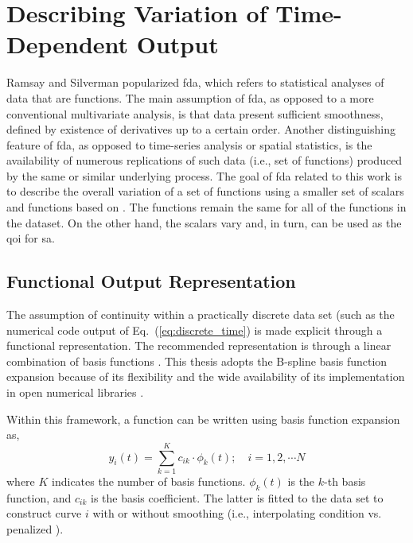 \section{Describing Variation of Time-Dependent Output}\label{sec:sa_time_dependent_variation}

Ramsay and Silverman \cite{Ramsay2005} popularized \gls{fda}, which refers to statistical analyses of data that are functions.
The main assumption of \gls{fda}, as opposed to a more conventional multivariate analysis, is that data present sufficient smoothness, defined by existence of derivatives up to a certain order.
Another distinguishing feature of \gls{fda}, as opposed to time-series analysis or spatial statistics, is the availability of numerous replications of such data (i.e., set of functions) produced by the same or similar underlying process. 
The goal of \gls{fda} related to this work is to describe the overall variation of a set of functions using a smaller set of scalars and functions based on .
The functions remain the same for all of the functions in the dataset. 
On the other hand, the scalars vary and, in turn, can be used as the \gls{qoi} for \gls{sa}.

\subsection{Functional Output Representation}\label{sub:sa_spline}

The assumption of continuity within a practically discrete data set (such as the numerical code output of Eq.~(\ref{eq:discrete_time}) is made explicit through a functional representation.
The recommended representation is through a linear combination of basis functions \cite{Ramsay2005}.
This thesis adopts the B-spline basis function \cite{Gillies2010} expansion because of its flexibility \cite{Eilers1996,Eilers2010} 
and the wide availability of its implementation in open numerical libraries \cite{RCT2017}.

Within this framework, a function can be written using basis function expansion as,
\begin{equation}
	y_i (t) = \sum_{k = 1}^{K} c_{ik} \cdot \phi_k (t); \quad i = 1, 2, \cdots N
\label{eq:basis_function_expansion}
\end{equation}
where $K$ indicates the number of basis functions. $\phi_k (t)$ is the $k$-th basis function, 
and $c_{ik}$ is the basis coefficient.
The latter is fitted to the data set to construct curve $i$ with or without smoothing (i.e., interpolating condition vs. penalized ).

